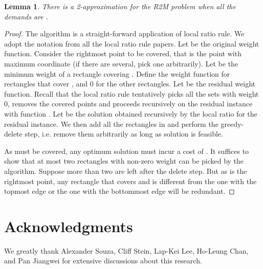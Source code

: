 \documentclass[11pt]{article}
\newtheorem{lemma}[thm]{Lemma}
\begin{document}
\begin{lemma}
\label{r2mlemma}
There is a 2-approximation for the R2M problem when all the demands are .
\end{lemma}
\begin{proof}
The algorithm is a straight-forward
application of local ratio rule. We adopt the notation from all the local ratio rule papers. Let  be
the original weight function. Consider the rightmost point  to be covered, that is the point  with
maximum  coordinate (if there are several, pick one arbitrarily). 
Let  be the minimum weight of a rectangle
covering . Define the weight function  for rectangles that cover , and 0 for the other rectangles. Let  be the residual weight function.
Recall that the local ratio rule tentatively picks all the sets  with  weight 0, removes the covered points and proceeds recursively on the residual instance with function .
Let  be the solution obtained recursively by the local ratio for the residual instance.
We then add all the rectangles in  and perform the greedy-delete step, i.e. remove them arbitrarily as
long as solution is feasible.

As  must be covered, any optimum solution must incur a  cost of .
It suffices to show that at most two rectangles with non-zero  weight can be picked by the algorithm.
Suppose more than two are left after the delete step. But as  is the rightmost point, any rectangle that covers  and is different from the one with the topmost edge or the one with the  bottommost edge will be redundant.
\end{proof}


\section*{ Acknowledgments} We greatly thank Alexander Souza, Cliff Stein, Lap-Kei Lee, Ho-Leung Chan,
and Pan Jiangwei for extensive discussions about this research.





\end{document}

